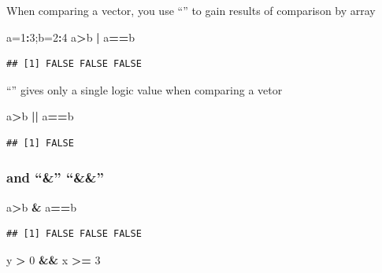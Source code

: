 \documentclass[]{article}
\newenvironment{Shaded}{\begin{snugshade}}{\end{snugshade}}
\newcommand{\DecValTok}[1]{\textcolor[rgb]{0.00,0.00,0.81}{#1}}
\newcommand{\NormalTok}[1]{#1}
\newcommand{\OperatorTok}[1]{\textcolor[rgb]{0.81,0.36,0.00}{\textbf{#1}}}
\newcommand{\StringTok}[1]{\textcolor[rgb]{0.31,0.60,0.02}{#1}}
\begin{document}
When comparing a vector, you use ``\textbar{}'' to gain results of
comparison by array

\begin{Shaded}
\begin{Highlighting}[]
\NormalTok{a=}\DecValTok{1}\OperatorTok{:}\DecValTok{3}\NormalTok{;b=}\DecValTok{2}\OperatorTok{:}\DecValTok{4}
\NormalTok{a}\OperatorTok{>}\NormalTok{b }\OperatorTok{|}\StringTok{ }\NormalTok{a}\OperatorTok{==}\NormalTok{b}
\end{Highlighting}
\end{Shaded}

\begin{verbatim}
## [1] FALSE FALSE FALSE
\end{verbatim}

``\textbar{}\textbar{}'' gives only a single logic value when comparing
a vetor

\begin{Shaded}
\begin{Highlighting}[]
\NormalTok{a}\OperatorTok{>}\NormalTok{b }\OperatorTok{||}\StringTok{ }\NormalTok{a}\OperatorTok{==}\NormalTok{b}
\end{Highlighting}
\end{Shaded}

\begin{verbatim}
## [1] FALSE
\end{verbatim}

\hypertarget{and}{%
\subsubsection{and ``\&'' ``\&\&''}\label{and}}

\begin{Shaded}
\begin{Highlighting}[]
\NormalTok{a}\OperatorTok{>}\NormalTok{b }\OperatorTok{&}\StringTok{ }\NormalTok{a}\OperatorTok{==}\NormalTok{b}
\end{Highlighting}
\end{Shaded}

\begin{verbatim}
## [1] FALSE FALSE FALSE
\end{verbatim}

\begin{Shaded}
\begin{Highlighting}[]
\NormalTok{y }\OperatorTok{>}\StringTok{ }\DecValTok{0} \OperatorTok{&&}\StringTok{ }\NormalTok{x }\OperatorTok{>=}\StringTok{ }\DecValTok{3}
\end{Highlighting}
\end{Shaded}
\end{document}
